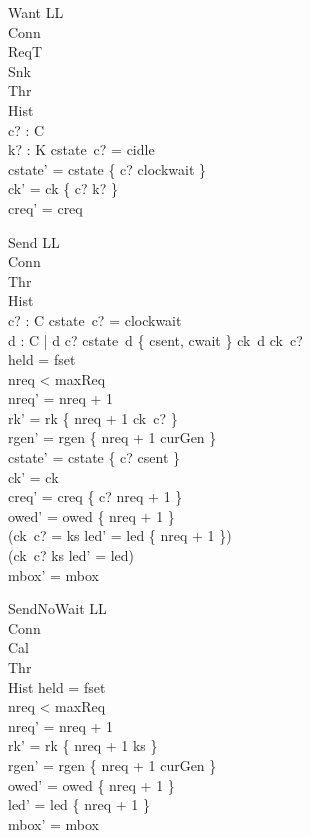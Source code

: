 \documentclass[a4paper,10pt,fleqn]{article}
\begin{document}
\begin{schema}{Want}
  \Delta LL \\
  \Xi Conn \\
  \Xi ReqT \\
  \Xi Snk \\
  \Xi Thr \\
  \Xi Hist \\
  c? : C \\
  k? : K
\where
  cstate~c? = cidle \\
  cstate' = cstate \oplus \{ c? \mapsto clockwait \} \\
  ck' = ck \oplus \{ c? \mapsto k? \} \\
  creq' = creq
\end{schema}

\begin{schema}{Send}
  \Delta LL \\
  \Xi Conn \\
  \Xi Thr \\
  \Xi Hist \\
  c? : C
\where
  cstate~c? = clockwait \\
  \forall d : C | d \neq c? \spot
    cstate~d \in \{ csent, cwait \} \implies ck~d \neq ck~c? \\
  held = fset \\
  nreq < maxReq \\
  nreq' = nreq + 1 \\
  rk' = rk \oplus \{ nreq + 1 \mapsto ck~c? \} \\
  rgen' = rgen \oplus \{ nreq + 1 \mapsto curGen \} \\
  cstate' = cstate \oplus \{ c? \mapsto csent \} \\
  ck' = ck \\
  creq' = creq \oplus \{ c? \mapsto nreq + 1 \} \\
  owed' = owed \cup \{ nreq + 1 \} \\
  (ck~c? = ks \implies led' = led \cup \{ nreq + 1 \}) \\
  (ck~c? \neq ks \implies led' = led) \\
  mbox' = mbox
\end{schema}

\begin{schema}{SendNoWait}
  \Delta LL \\
  \Xi Conn \\
  \Xi Cal \\
  \Xi Thr \\
  \Xi Hist
\where
  held = fset \\
  nreq < maxReq \\
  nreq' = nreq + 1 \\
  rk' = rk \oplus \{ nreq + 1 \mapsto ks \} \\
  rgen' = rgen \oplus \{ nreq + 1 \mapsto curGen \} \\
  owed' = owed \cup \{ nreq + 1 \} \\
  led' = led \cup \{ nreq + 1 \} \\
  mbox' = mbox
\end{schema}
\end{document}
